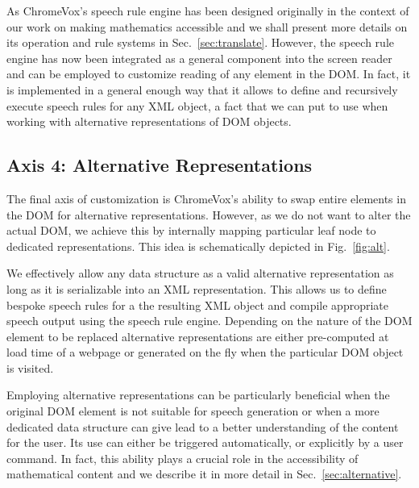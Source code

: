 \documentclass{sig-alternate}
\begin{document}
As ChromeVox's speech rule engine has been designed originally in the context of
our work on making mathematics accessible and we shall present more details on
its operation and rule systems in Sec.~\ref{sec:translate}. However, the speech
rule engine has now been integrated as a general component into the screen
reader and can be employed to customize reading of any element in the DOM. In
fact, it is implemented in a general enough way that it allows to define and
recursively execute speech rules for any XML object, a fact that we can put to
use when working with alternative representations of DOM objects.


\subsection{Axis 4: Alternative Representations}
\label{sec:ax4}


The final axis of customization is ChromeVox's ability to swap entire elements
in the DOM for alternative representations. However, as we do not want to alter
the actual DOM, we achieve this by internally mapping particular leaf node to
dedicated representations. This idea is schematically depicted in
Fig.~\ref{fig:alt}.


We effectively allow any data structure as a valid alternative representation as
long as it is serializable into an XML representation. This allows us to define
bespoke speech rules for a the resulting XML object and compile appropriate
speech output using the speech rule engine. Depending on the nature of the DOM
element to be replaced alternative representations are either pre-computed at
load time of a webpage or generated on the fly when the particular DOM object is
visited.

Employing alternative representations can be particularly beneficial when the
original DOM element is not suitable for speech generation or when a more
dedicated data structure can give lead to a better understanding of the content
for the user. Its use can either be triggered automatically, or explicitly by a
user command. In fact, this ability plays a crucial role in the accessibility of
mathematical content and we describe it in more detail in
Sec.~\ref{sec:alternative}.
\end{document}
